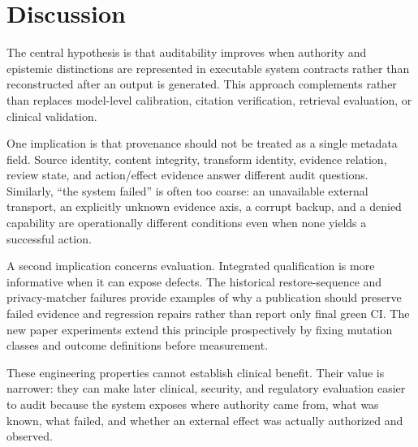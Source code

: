 \section{Discussion}

The central hypothesis is that auditability improves when authority and epistemic distinctions are represented in executable system contracts rather than reconstructed after an output is generated. This approach complements rather than replaces model-level calibration, citation verification, retrieval evaluation, or clinical validation.

One implication is that provenance should not be treated as a single metadata field. Source identity, content integrity, transform identity, evidence relation, review state, and action/effect evidence answer different audit questions. Similarly, ``the system failed'' is often too coarse: an unavailable external transport, an explicitly unknown evidence axis, a corrupt backup, and a denied capability are operationally different conditions even when none yields a successful action.

A second implication concerns evaluation. Integrated qualification is more informative when it can expose defects. The historical restore-sequence and privacy-matcher failures provide examples of why a publication should preserve failed evidence and regression repairs rather than report only final green CI. The new paper experiments extend this principle prospectively by fixing mutation classes and outcome definitions before measurement.

These engineering properties cannot establish clinical benefit. Their value is narrower: they can make later clinical, security, and regulatory evaluation easier to audit because the system exposes where authority came from, what was known, what failed, and whether an external effect was actually authorized and observed.
